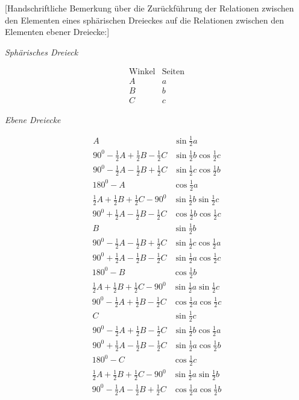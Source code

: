 %
\par\medskip{}
[Handschriftliche Bemerkung über die Zurückführung der Relationen zwischen den Elementen eines sphärischen Dreieckes auf die Relationen zwischen den Elementen ebener Dreiecke:]
\begin{center}\textit{Sphärisches Dreieck}\end{center}
\[
\begin{array}{cc}\text{Winkel}&\text{Seiten}\\ A&a\\B&b\\C&c\end{array}
\]
\begin{center}\textit{Ebene Dreiecke}\end{center}
\[
\begin{array}{ll}
A&\sin\tfrac12a\\
90^0-\tfrac12A+\tfrac12B-\tfrac12C&\sin\tfrac12b\cos\tfrac12c\\
90^0-\tfrac12A-\tfrac12B+\tfrac12C&\sin\tfrac12c\cos\tfrac12b
\end{array}
\]
\[
\begin{array}{ll}
180^0-A&\cos\tfrac12a\\
\tfrac12A+\tfrac12B+\tfrac12C-90^0&\sin\tfrac12b\sin\tfrac12c\\
90^0+\tfrac12A-\tfrac12B-\tfrac12C&\cos\tfrac12b\cos\tfrac12c
\end{array}
\]
\[
\begin{array}{ll}
B&\sin\tfrac12b\\
90^0-\tfrac12A-\tfrac12B+\tfrac12C&\sin\tfrac12c\cos\tfrac12a\\
90^0+\tfrac12A-\tfrac12B-\tfrac12C&\sin\tfrac12a\cos\tfrac12c
\end{array}
\]
\[
\begin{array}{ll}
180^0-B&\cos\tfrac12b\\
\tfrac12A+\tfrac12B+\tfrac12C-90^0&\sin\tfrac12a\sin\tfrac12c\\
90^0-\tfrac12A+\tfrac12B-\tfrac12C&\cos\tfrac12a\cos\tfrac12c
\end{array}
\]
\[
\begin{array}{ll}
C&\sin\tfrac12c\\
90^0-\tfrac12A+\tfrac12B-\tfrac12C&\sin\tfrac12b\cos\tfrac12a\\
90^0+\tfrac12A-\tfrac12B-\tfrac12C&\sin\tfrac12a\cos\tfrac12b
\end{array}
\]
\[
\begin{array}{ll}
180^0-C&\cos\tfrac12c\\
\tfrac12A+\tfrac12B+\tfrac12C-90^0&\sin\tfrac12a\sin\tfrac12b\\
90^0-\tfrac12A-\tfrac12B+\tfrac12C&\cos\tfrac12a\cos\tfrac12b
\end{array}
\]
